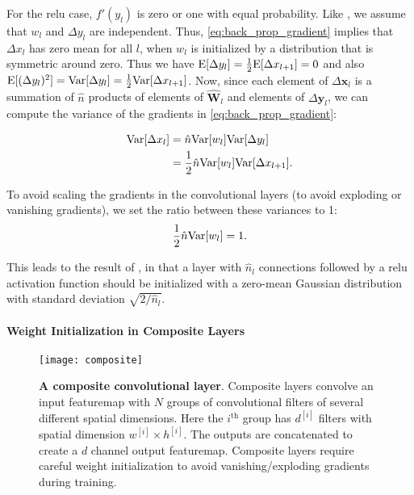 \documentclass[thesis]{subfiles}
\begin{document}
    For the \gls{relu} case, $f'(y_l)$ is zero or one with equal probability. 
    Like \citet{glorot2010understanding}, we assume that $w_l$ and $\Delta y_l$ are independent. Thus, \cref{eq:back_prop_gradient} implies that $\Delta x_l$ has zero mean for all $l$, when $w_l$ is initialized by a distribution that is symmetric around zero. Thus we have $\mathrm{E}[\Delta y_l] = \frac{1}{2}\mathrm{E}[\Delta x_{l+1}]= 0$ and also $\mathrm{E}[(\Delta y_l)^2] = \mathrm{Var}[\Delta y_l] = \frac{1}{2} \mathrm{Var}[\Delta x_{l+1}]$. Now, since each element of $\Delta \mathbf{x}_l$ is a summation of $\hat n$ products of elements of $\hat{\mathbf{W}}_l$ and elements of $\Delta \mathbf{y}_l$, we can compute the variance of the gradients in \cref{eq:back_prop_gradient}:
    
    \begin{equation}
    \begin{aligned}
    \mathrm{Var}[\Delta x_l] &=  \hat{n} \mathrm{Var}[w_l] \mathrm{Var}[\Delta y_l]\\
    &= \frac{1}{2}   \hat{n} \mathrm{Var}[w_l] \mathrm{Var} [\Delta x_{l+1}].
    \end{aligned}
    \end{equation}
    
    
    To avoid scaling the gradients in the convolutional layers (to avoid exploding or vanishing gradients), we set the ratio between these variances to 1:
    \begin{equation}
    \frac{1}{2} \hat{n} \mathrm{Var}[w_l] = 1.
    \end{equation}
    
    This leads to the result of \citet{He2015b}, in that a layer with $\hat{n}_l$ connections followed by a \gls{relu} activation function should be initialized with a zero-mean Gaussian distribution with standard deviation $\sqrt{2/ \hat{n}_l}$.
    
    \paragraph{Weight Initialization in Composite Layers}
    \begin{figure}[tbp]
        \centering
        \texttt{[image: composite]}
        \caption[A composite convolutional layer]{{\bf A composite convolutional layer}. Composite layers convolve an input \gls{featuremap} with $N$ groups of convolutional filters of several different spatial dimensions. Here the $i^\text{th}$ group has $d^{[i]}$ filters with spatial dimension $w^{[i]} \times h^{[i]}$. The outputs are concatenated to create a $d$ channel output \gls{featuremap}. Composite layers require careful weight initialization to avoid vanishing/exploding gradients during training.}
        \label{fig:compositelayers}
    \end{figure}
    
\end{document}
